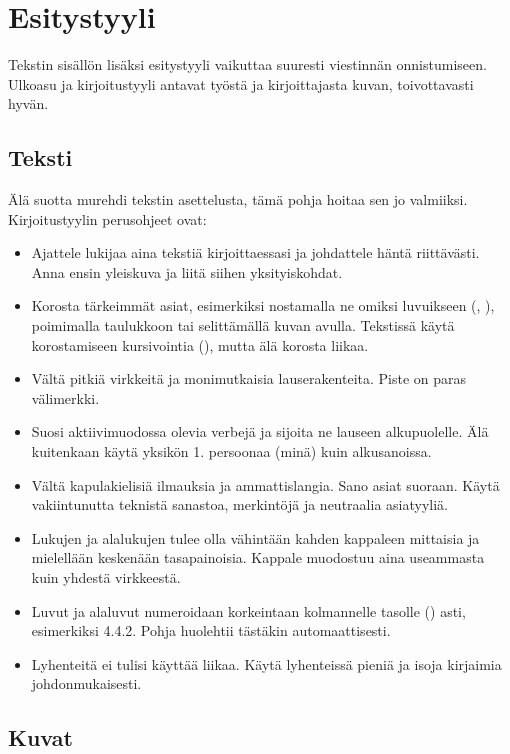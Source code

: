 \chapter{Esitystyyli}
\label{ch:esitystyyli}

Tekstin sisällön lisäksi esitystyyli vaikuttaa suuresti viestinnän onnistumiseen. Ulkoasu ja kirjoitustyyli antavat työstä ja kirjoittajasta kuvan, toivottavasti hyvän.

\section{Teksti}

Älä suotta murehdi tekstin asettelusta, tämä pohja hoitaa sen jo valmiiksi. Kirjoitustyylin perusohjeet ovat:

\begin{itemize}
\item Ajattele lukijaa aina tekstiä kirjoittaessasi ja johdattele häntä riittävästi. Anna ensin yleiskuva ja liitä siihen yksityiskohdat. 
\item Korosta tärkeimmät asiat, esimerkiksi nostamalla ne omiksi luvuikseen (, ), poimimalla taulukkoon tai selittämällä kuvan avulla. Tekstissä käytä korostamiseen kursivointia (), mutta älä korosta liikaa.
\item Vältä pitkiä virkkeitä ja monimutkaisia lauserakenteita. Piste on paras välimerkki. 
\item Suosi aktiivimuodossa olevia verbejä ja sijoita ne lauseen alkupuolelle. Älä kuitenkaan käytä yksikön 1. persoonaa (minä) kuin alkusanoissa. 
\item Vältä kapulakielisiä ilmauksia ja ammattislangia. Sano asiat suoraan. Käytä vakiintunutta teknistä sanastoa, merkintöjä ja neutraalia asiatyyliä. 
\item Lukujen ja alalukujen tulee olla vähintään kahden kappaleen mittaisia ja mielellään keskenään tasapainoisia. Kappale muodostuu aina useammasta kuin yhdestä virkkeestä. 
\item Luvut ja alaluvut numeroidaan korkeintaan kolmannelle tasolle () asti, esimerkiksi 4.4.2. Pohja huolehtii tästäkin automaattisesti.
\item Lyhenteitä ei tulisi käyttää liikaa. Käytä lyhenteissä pieniä ja isoja kirjaimia johdonmukaisesti. 
\end{itemize}

\section{Kuvat}

